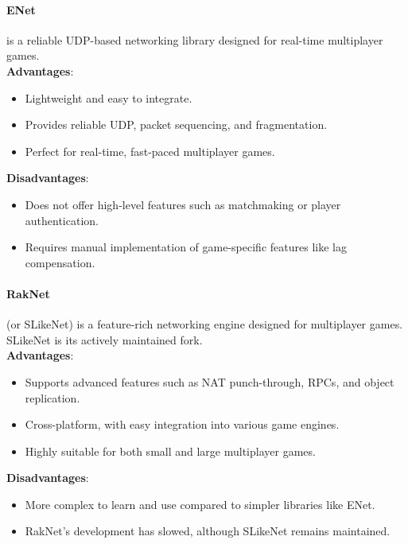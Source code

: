 \documentclass{article} %
\begin{document}
\paragraph{ENet} is a reliable UDP-based networking library designed for real-time multiplayer games.
\\
\textbf{Advantages}:
\begin{itemize}
    \item Lightweight and easy to integrate.
    \item Provides reliable UDP, packet sequencing, and fragmentation.
    \item Perfect for real-time, fast-paced multiplayer games.
\end{itemize}
\textbf{Disadvantages}:
\begin{itemize}
    \item Does not offer high-level features such as matchmaking or player authentication.
    \item Requires manual implementation of game-specific features like lag compensation.
\end{itemize}

\paragraph{RakNet} (or SLikeNet) is a feature-rich networking engine designed for multiplayer games. SLikeNet is its actively maintained fork.
\\
\textbf{Advantages}:
\begin{itemize}
    \item Supports advanced features such as NAT punch-through, RPCs, and object replication.
    \item Cross-platform, with easy integration into various game engines.
    \item Highly suitable for both small and large multiplayer games.
\end{itemize}
\textbf{Disadvantages}:
\begin{itemize}
    \item More complex to learn and use compared to simpler libraries like ENet.
    \item RakNet’s development has slowed, although SLikeNet remains maintained.
\end{itemize}
\end{document}
